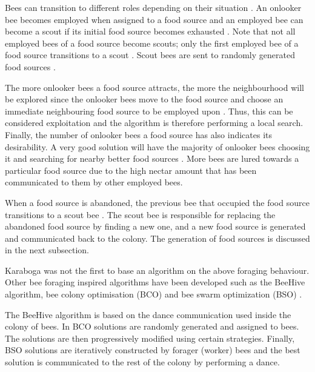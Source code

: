 Bees can transition to different roles depending on their situation \cite{ABCCompareStudy,ABCNumericalOptimization}. An onlooker bee becomes employed when assigned to a food source and an employed bee can become a scout if its initial food source becomes exhausted \cite{ABCImageEnhancement,ABCCompareStudy,ABCReconfigDistro}. Note that not all employed bees of a food source become scouts; only the first employed bee of a food source transitions to a scout \cite{ABCImageEnhancement,ABCCompareStudy,ABCReconfigDistro}. Scout bees are sent to randomly generated food sources \cite{ABCImageEnhancement,ABCCompareStudy,ABCReconfigDistro}. 

The more onlooker bees a food source attracts, the more the neighbourhood will be explored since the onlooker bees move to the food source and choose an immediate neighbouring food source to be employed upon \cite{ABCCompareStudy,ABCNumericalOptimization}. Thus, this can be considered exploitation and the algorithm is therefore performing a local search\cite{ABCCompareStudy,ABCReconfigDistro,ABCNumericalOptimization}. Finally, the number of onlooker bees a food source has also indicates its desirability. A very good solution will have the majority of onlooker bees choosing it and searching for nearby better food sources \cite{ABCCompareStudy,ABCReconfigDistro,ABCNumericalOptimization}. More bees are lured towards a particular food source due to the high nectar amount that has been communicated to them by other employed bees\cite{ABCCompareStudy,ABCReconfigDistro,ABCNumericalOptimization}.

When a food source is abandoned, the previous bee that occupied the food source transitions to a scout bee \cite{ABCCompareStudy,ABCNumericalOptimization}. The scout bee is responsible for replacing the abandoned food source by finding a new one, and a new food source is generated and communicated back to the colony\cite{ABCCompareStudy,ABCImageEnhancement,ABCNumericalOptimization}. The generation of food sources is discussed in the next subsection.

Karaboga was not the first to base an algorithm on the above foraging behaviour. Other bee foraging inspired algorithms have been developed such as the BeeHive algorithm, bee colony optimisation (BCO) and bee swarm optimization (BSO) \cite{BCO,HybridABCClustering,ABCNumericalOptimization}. 

The BeeHive algorithm is based on the dance communication used inside the colony of bees. In BCO solutions are randomly generated and assigned to bees\cite{HybridABCClustering,ABCNumericalOptimization}. The solutions are then progressively modified using certain strategies. Finally, BSO solutions are iteratively constructed by forager (worker) bees and the best solution is communicated to the rest of the colony by performing a dance\cite{HybridABCClustering,ABCNumericalOptimization}.

